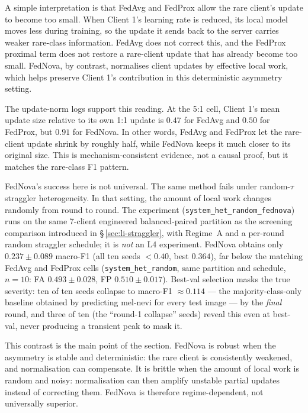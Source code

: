 \documentclass[11pt,a4paper]{report}
\begin{document}
A simple interpretation is that FedAvg and FedProx allow the rare client's
update to become too small. When Client 1's learning rate is reduced, its
local model moves less during training, so the update it sends back to the
server carries weaker rare-class information. FedAvg does not correct this,
and the FedProx proximal term does not restore a rare-client update that has
already become too small. FedNova, by contrast, normalises client updates by
effective local work, which helps preserve Client 1's contribution in this
deterministic asymmetry setting.

The update-norm logs support this reading. At the 5:1 cell, Client 1's mean
update size relative to its own 1:1 update is $0.47$ for FedAvg and $0.50$
for FedProx, but $0.91$ for FedNova. In other words, FedAvg and FedProx let
the rare-client update shrink by roughly half, while FedNova keeps it much
closer to its original size. This is mechanism-consistent evidence, not a
causal proof, but it matches the rare-class F1 pattern.

FedNova's success here is not universal. The same method fails under
random-$\tau$ straggler heterogeneity. In that setting, the amount of local
work changes randomly from round to round. The experiment
(\texttt{system\_het\_random\_fednova}) runs on the same 7-client
engineered balanced-paired partition as the screening comparison
introduced in \S\,\ref{sec:li-straggler}, with Regime~A and a per-round
random straggler schedule; it is \emph{not} an L4 experiment. FedNova
obtains only $0.237 \pm 0.089$ macro-F1 (all ten seeds $< 0.40$, best
$0.364$), far below the matching FedAvg and FedProx cells
(\texttt{system\_het\_random}, same partition and schedule, $n = 10$:
FA $0.493 \pm 0.028$, FP $0.510 \pm 0.017$). Best-val selection masks
the true severity: ten of ten seeds collapse to macro-F1
$\approx 0.114$ --- the majority-class-only baseline obtained by
predicting mel-nevi for every test image --- by the \emph{final}
round, and three of ten (the ``round-1 collapse'' seeds) reveal this
even at best-val, never producing a transient peak to mask it.

This contrast is the main point of the section. FedNova is robust when the
asymmetry is stable and deterministic: the rare client is consistently
weakened, and normalisation can compensate. It is brittle when the amount of
local work is random and noisy: normalisation can then amplify unstable
partial updates instead of correcting them. FedNova is therefore
regime-dependent, not universally superior.
\end{document}

